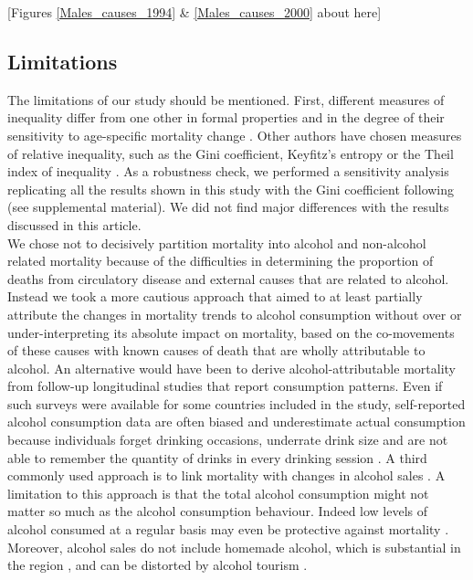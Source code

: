 \documentclass{article}
\begin{document}
\begin{spacing}{1.5}
\begin{center}
[Figures \ref{Males_causes_1994} \& \ref{Males_causes_2000} about here]\\
\end{center}


\subsection*{Limitations} 
The limitations of our study should be mentioned. First, different measures of inequality differ from one other in formal properties and in the degree of their sensitivity to age-specific mortality change \citep{vanraalte2013}. Other authors have chosen measures of relative inequality, such as the Gini coefficient, Keyfitz's entropy or the Theil index of inequality \citep{shkolnikov2003,moser2005world,smits2009,colchero2016emergence}. As a robustness check, we performed a sensitivity analysis replicating all the results shown in this study with the Gini coefficient following \citet{shkolnikov2003} (see supplemental material). We did not find major differences with the results discussed in this article. \\

We chose not to decisively partition mortality into alcohol and non-alcohol related mortality because of the difficulties in determining the proportion of deaths from circulatory disease and external causes that are related to alcohol. Instead we took a more cautious approach that aimed to at least partially attribute the changes in mortality trends to alcohol consumption without over or under-interpreting its absolute impact on mortality, based on the co-movements of these causes with known causes of death that are wholly attributable to alcohol. An alternative would have been to derive alcohol-attributable mortality from follow-up longitudinal studies that report consumption patterns. Even if such surveys were available for some countries included in the study, self-reported alcohol consumption data are often biased and underestimate actual consumption because individuals forget drinking occasions, underrate drink size and are not able to remember the quantity of drinks in every drinking session \citep{livingston2015underreporting,bellis2009off}. A third commonly used approach is to link mortality with changes in alcohol sales \citep{ evgeny2010beverage}. A limitation to this approach is that the total alcohol consumption might not matter so much as the alcohol consumption behaviour. Indeed low levels of alcohol consumed at a regular basis may even be protective against mortality \citep{bell2017,rehm2010relation, klatsky1974alcohol, roerecke2014alcohol}. Moreover, alcohol sales do not include homemade alcohol, which is substantial in the region \citep{popova2007comparing,mckee2005composition}, and can be distorted by alcohol tourism \citep{makela2009weakening,rabinovich2009affordability}. \\


\end{spacing}
\end{document}
